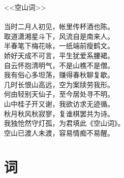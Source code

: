 \documentclass[12pt,a4paper]{article}
\begin{document}
\begin{center}
<<空山词>>\\
\qquad\\
当时二月人初见，帐里传杯酒也陈。\\
取道潇湘星斗下，风流自是南来人。\\
半春笔下梅花咏，一纸端前瘦鹤文。\\
娇好天成不可言，平生犹爱系腰裙。\\
自云怀抱清明气，不是山樵不是僧。\\
我有俗心多坦荡，赚得春秋聊复歇。\\
几时长恨山高远，空为案牍劳我形。\\
何由轻别天仙子，至今居处寻不明。\\
山中桂子开又谢，我欲访求无迹循。\\
秋月秋风秋寂寥，复谁棋罢共为诗。\\
我独怆然守灯孤，为君填此《空山词》。\\
空山已渡人未渡，容易情痴不易醒。\\
\end{center}
\section*{词}
\end{document}
